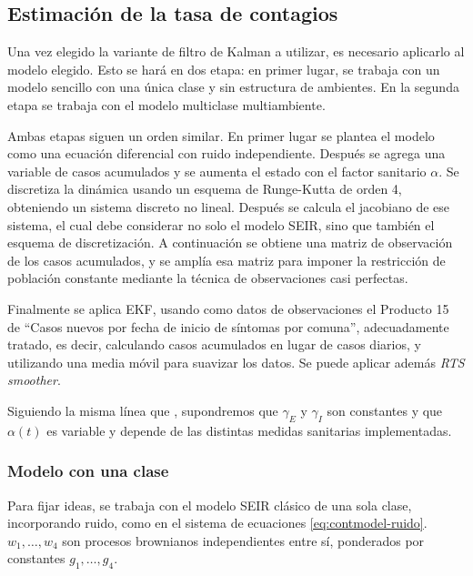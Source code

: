 \subsection{Estimación de la tasa de contagios}\label{met-subsec:contagios}

Una vez elegido la variante de filtro de Kalman a utilizar, es necesario aplicarlo al modelo elegido. Esto se hará en dos etapa: en primer lugar, se trabaja con un modelo sencillo con una única clase y sin estructura de ambientes. En la segunda etapa se trabaja con el modelo multiclase multiambiente.

Ambas etapas siguen un orden similar. En primer lugar se plantea el modelo como una ecuación diferencial con ruido independiente. Después se agrega una variable de casos acumulados y se aumenta el estado con el factor sanitario  \(\alpha\). Se discretiza la dinámica usando un esquema de Runge-Kutta de orden 4, obteniendo un sistema discreto no lineal. Después se calcula el jacobiano de ese sistema, el cual debe considerar no solo el modelo SEIR, sino que también el esquema de discretización. A continuación se obtiene una matriz de observación de los casos acumulados, y se amplía esa matriz para imponer la restricción de población constante mediante la técnica de observaciones casi perfectas. 

Finalmente se aplica EKF, usando como datos de observaciones el Producto 15 de \cite{MINCIENCIA} ``Casos nuevos por fecha de inicio de síntomas por comuna'', adecuadamente tratado, es decir, calculando casos acumulados en lugar de casos diarios, y utilizando una media móvil para suavizar los datos. Se puede aplicar además \textit{RTS smoother}.


Siguiendo la misma línea que \cite{Hasan2020}\cite{Hasan2021}\cite{Hasan2021a}, supondremos que \(\gamma_E\) y \(\gamma_I\) son constantes y que \(\alpha(t)\) es variable y depende de las distintas medidas sanitarias implementadas.


\subsubsection*{Modelo con una clase}


Para fijar ideas, se trabaja con el modelo SEIR clásico de una sola clase, incorporando ruido, como en el sistema de ecuaciones \ref{eq:contmodel-ruido}. \(w_1, \dots, w_4\) son procesos brownianos independientes entre sí, ponderados por constantes \(g_1, \dots, g_4\).

